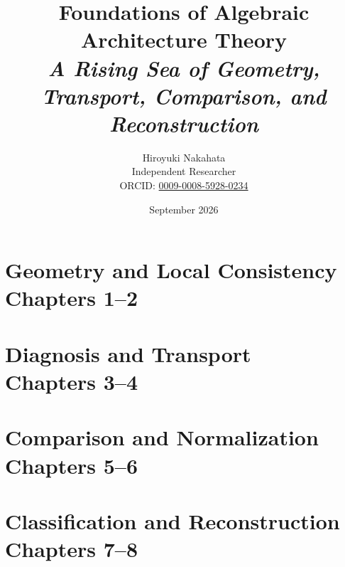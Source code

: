 \documentclass[11pt]{report}
\title{\textbf{Foundations of Algebraic Architecture Theory}\\[0.6em]
\large\itshape A Rising Sea of Geometry, Transport, Comparison, and Reconstruction}
\author{Hiroyuki Nakahata\\
\normalsize Independent Researcher\\
\normalsize ORCID: \href{https://orcid.org/0009-0008-5928-0234}{0009-0008-5928-0234}}
\date{\normalsize September 2026}
\theoremstyle{plain}
\theoremstyle{definition}
\newcommand{\lettersections}[1]{%
  \setcounter{section}{0}%
  \renewcommand{\thesection}{#1.\arabic{section}}%
  \renewcommand{\theHsection}{#1.\arabic{section}}}
\newcommand{\chaptersections}{%
  \renewcommand{\thesection}{\thechapter.\arabic{section}}%
  \renewcommand{\theHsection}{\theHchapter.\arabic{section}}}
\begin{document}
\nocite{Stacks,FGMPS04,Spivak12,SAGA,GB92,AG97,Goguen92,Gibson26,AB11,AMB12,Young26,CC77,GRS00,SSVW17,Shulman08,BS81,JRW12,Lawvere63,BW85,Kelly82,BMW12,BIAN9,ReS,McLarty03}

\maketitle

\begin{abstract}

\end{abstract}

\tableofcontents



\lettersections{P}

\chaptersections

\part[Geometry and Local Consistency]{Geometry and Local Consistency\\[0.8em]{\large Chapters 1--2}}



\part[Diagnosis and Transport]{Diagnosis and Transport\\[0.8em]{\large Chapters 3--4}}



\part[Comparison and Normalization]{Comparison and Normalization\\[0.8em]{\large Chapters 5--6}}



\part[Classification and Reconstruction]{Classification and Reconstruction\\[0.8em]{\large Chapters 7--8}}



\lettersections{R}







\appendix
\chaptersections



\end{document}

